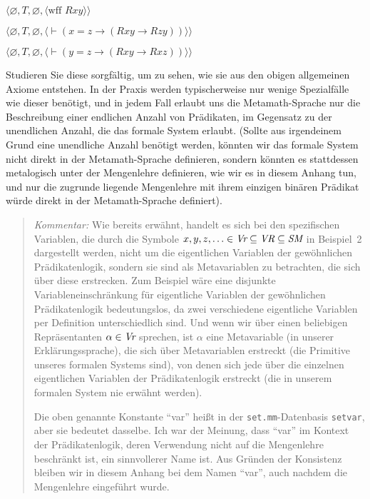 \begin{list}{}{\itemsep 0.0pt}
      \item[] $\langle\varnothing,T,\varnothing,
               \langle \mbox{wff\ }R x y\rangle\rangle$
      \item[] $\langle\varnothing,T,\varnothing,
               \langle \vdash(x=z
                  \to(R x y \to R z y))
               \rangle\rangle$
      \item[] $\langle\varnothing,T,\varnothing,
               \langle \vdash(y=z
                  \to(R x y \to R x z))
               \rangle\rangle$
\end{list}
Studieren Sie diese sorgfältig, um zu sehen, wie sie aus den obigen allgemeinen Axiome entstehen.  In der Praxis werden typischerweise nur wenige Spezialfälle wie dieser benötigt, und in jedem Fall erlaubt uns die Metamath-Sprache nur die Beschreibung einer endlichen Anzahl von Prädikaten, im Gegensatz zu der unendlichen Anzahl, die das formale System erlaubt.  (Sollte aus irgendeinem Grund eine unendliche Anzahl benötigt werden, könnten wir das formale System nicht direkt in der Metamath-Sprache definieren, sondern könnten es stattdessen metalogisch unter der Mengenlehre definieren, wie wir es in diesem Anhang tun, und nur die zugrunde liegende Mengenlehre mit ihrem einzigen binären Prädikat würde direkt in der Metamath-Sprache definiert).


{\footnotesize\begin{quotation}
{\em Kommentar:}  Wie bereits erwähnt, handelt es sich bei den spezifischen Variablen, die durch die Symbole $x,y,z,\ldots\in \mbox{\em Vr}\subseteq \mbox{\em VR}\subseteq \mbox{\em SM}$ in Beispiel~2 dargestellt werden, nicht um die eigentlichen Variablen der gewöhnlichen Prädikatenlogik, sondern sie sind als Metavariablen zu betrachten, die sich über diese erstrecken.  Zum Beispiel wäre eine disjunkte Variableneinschränkung für eigentliche Variablen der gewöhnlichen Prädikatenlogik bedeutungslos, da zwei verschiedene eigentliche Variablen per Definition unterschiedlich sind.  Und wenn wir über einen beliebigen Repräsentanten $\alpha\in \mbox{\em Vr}$ sprechen, ist $\alpha$ eine Metavariable (in unserer Erklärungssprache), die sich über Metavariablen erstreckt (die Primitive unseres formalen Systems sind), von denen sich jede über die einzelnen eigentlichen Variablen der Prädikatenlogik erstreckt (die in unserem formalen System nie erwähnt werden).

Die oben genannte Konstante "`var"' heißt in der \texttt{set.mm}-Datenbasis \texttt{setvar}, aber sie bedeutet dasselbe.  Ich war der Meinung, dass "`var"' im Kontext der Prädikatenlogik, deren Verwendung nicht auf die Mengenlehre beschränkt ist, ein sinnvollerer Name ist.  Aus Gründen der Konsistenz bleiben wir in diesem Anhang bei dem Namen "`var"', auch nachdem die Mengenlehre eingeführt wurde.
\end{quotation}}


